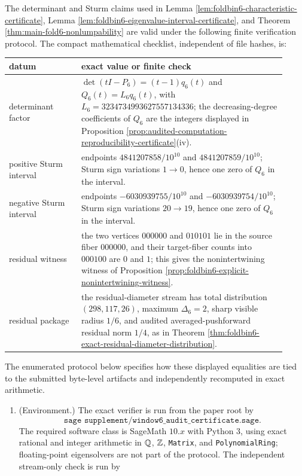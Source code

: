 \begin{proposition}\label{prop:journal-facing-computation-proof-protocol}
The determinant and Sturm claims used in Lemma \ref{lem:foldbin6-characteristic-certificate}, Lemma \ref{lem:foldbin6-eigenvalue-interval-certificate}, and Theorem \ref{thm:main-fold6-nonlumpability} are valid under the following finite verification protocol.
The compact mathematical checklist, independent of file hashes, is:
\begin{center}
\small
\begin{tabular}{p{0.24\linewidth}|p{0.68\linewidth}}
datum & exact value or finite check\\ \hline
determinant factor & \(\det(tI-P_6)=(t-1)q_6(t)\) and \(Q_6(t)=L_6q_6(t)\), with \(L_6=3234734993627557134336\); the decreasing-degree coefficients of \(Q_6\) are the integers displayed in Proposition \ref{prop:audited-computation-reproducibility-certificate}\textup{(iv)}.\\
positive Sturm interval & endpoints \(4841207858/10^{10}\) and \(4841207859/10^{10}\); Sturm sign variations \(1\to0\), hence one zero of \(Q_6\) in the interval.\\
negative Sturm interval & endpoints \(-6030939755/10^{10}\) and \(-6030939754/10^{10}\); Sturm sign variations \(20\to19\), hence one zero of \(Q_6\) in the interval.\\
residual witness & the two vertices \(000000\) and \(010101\) lie in the source fiber \(000000\), and their target-fiber counts into \(000100\) are \(0\) and \(1\); this gives the nonintertwining witness of Proposition \ref{prop:foldbin6-explicit-nonintertwining-witness}.\\
residual package & the residual-diameter stream has total distribution \((298,117,26)\), maximum \(\Delta_6=2\), sharp visible radius \(1/6\), and audited averaged-pushforward residual norm \(1/4\), as in Theorem \ref{thm:foldbin6-exact-residual-diameter-distribution}.
\end{tabular}
\end{center}
The enumerated protocol below specifies how these displayed equalities are tied to the submitted byte-level artifacts and independently recomputed in exact arithmetic.
\begin{enumerate}[label=\textup{(\roman*)}]
\item \textup{(Environment.)}  The exact verifier is run from the paper root by
\[
\texttt{sage supplement/window6\_audit\_certificate.sage}.
\]
The required software class is SageMath \(10.x\) with Python \(3\), using exact rational and integer arithmetic in \(\mathbb{Q}\), \(\mathbb{Z}\), \texttt{Matrix}, and \texttt{PolynomialRing}; floating-point eigensolvers are not part of the protocol.  The independent stream-only check is run by

\end{enumerate}
\end{proposition}
